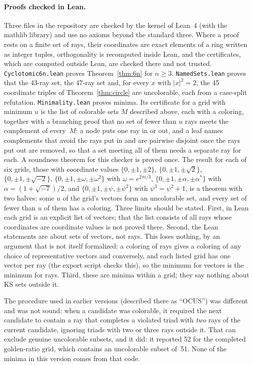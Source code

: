 \paragraph{Proofs checked in Lean.}  Three files in the repository are checked by the kernel of
Lean~4 (with the mathlib library) and use no axioms beyond the standard three.  Where a proof
rests on a finite set of rays, their coordinates are exact elements of a ring written as
integer tuples, orthogonality is recomputed inside Lean, and the certificates, which are
computed outside Lean, are checked there and not trusted.
\texttt{Cyclotomic6n.lean} proves Theorem~\ref{thm:6n} for $n\ge3$.
\texttt{NamedSets.lean} proves that the 43-ray set, the 47-ray set and, for every $x$ with
$|x|^2=2$, the 45 coordinate triples of Theorem~\ref{thm:circle} are uncolorable, each from a case-split
refutation.  \texttt{Minimality.lean} proves minima.  Its certificate for a grid with minimum
$u$ is the list of colorable sets $M$ described above, each with a coloring, together with a
branching proof that no set of fewer than $u$ rays meets the complement of every~$M$: a node
puts one ray in or out, and a leaf names complements that avoid the rays put in and are pairwise
disjoint once the rays put out are removed, so that a set meeting all of them needs a separate
ray for each.  A soundness theorem for this checker is proved once.  The result for each of six
grids, those with coordinate values $\{0,\pm1,\pm2\}$, $\{0,\pm1,\pm\sqrt2\}$,
$\{0,\pm1,\pm\sqrt{-2}\}$, $\{0,\pm1,\pm\omega,\pm\omega^2\}$ with $\omega=e^{2\pi i/3}$, $\{0,\pm1,\pm\alpha,\pm\alpha^{*}\}$ with
$\alpha=(1+\sqrt{-7})/2$, and
$\{0,\pm1,\pm\psi,\pm\psi^2\}$ with $\psi^3=\psi^2+1$, is a theorem with two halves: some $u$ of
the grid's vectors form an uncolorable set, and every set of fewer than $u$ of them has a
coloring.  Three limits should be stated.  First, in Lean each grid is an explicit list of
vectors; that the list consists of all rays whose coordinates are coordinate values is not
proved there.  Second, the Lean statements are about sets of vectors, not rays.  This loses nothing,
by an argument that is not itself formalized: a coloring of rays gives a coloring of any choice
of representative vectors and conversely, and each listed grid has one vector per ray (the
export script checks this), so the minimum for vectors is the minimum for rays.  Third, these
are minima within a grid; they
say nothing about KS sets outside it.

The procedure used in earlier versions (described there as ``OCUS'') was different and was not
sound: when a candidate was colorable, it required the next candidate to contain a ray that
completes a violated triad with \emph{two} rays of the current candidate, ignoring triads with
two or three rays outside it.  That can exclude genuine uncolorable subsets, and it did: it
reported 52 for the completed golden-ratio grid, which contains an uncolorable subset of~51.
None of the minima in this version comes from that code.
